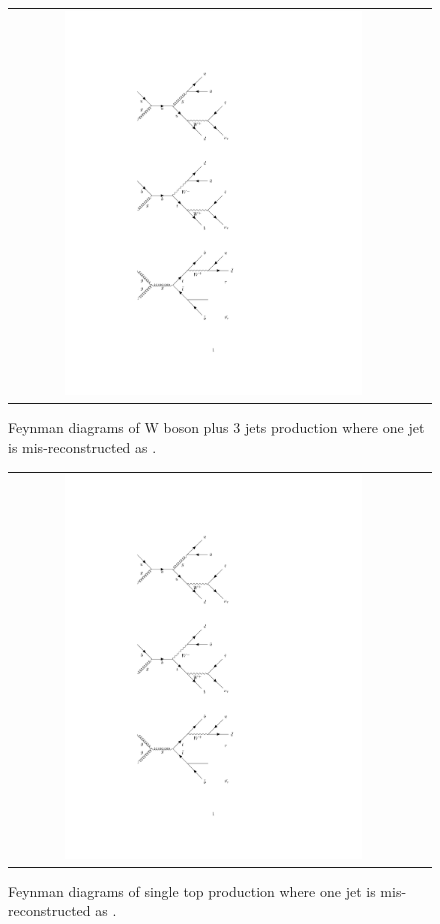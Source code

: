 \begin{figure}[tbh!]
	\centering
	\begin{tabular}{cc}
		\includegraphics[width=0.75\textwidth]{diagrams/pics/background_W3jets.pdf}
	\end{tabular}
	\caption{Feynman diagrams of W boson plus 3 jets production where one jet is mis-reconstructed as \hadtau. }
	\label{fig:background_W3jets}
\end{figure}

\begin{figure}[tbh!]
	\centering
	\begin{tabular}{cc}
		\includegraphics[width=0.75\textwidth]{diagrams/pics/background_singlet.pdf}
	\end{tabular}
	\caption{Feynman diagrams of single top production where one jet is mis-reconstructed as \hadtau. }
	\label{fig:background_singlet}
\end{figure}

